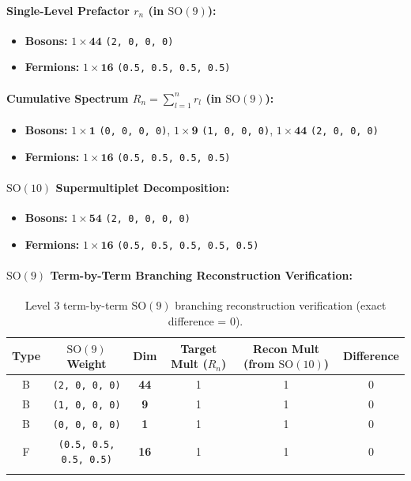 \documentclass[11pt,a4paper]{article}
\begin{document}
\paragraph{Single-Level Prefactor $r_n$ (in $\mathrm{SO}(9)$):}
\begin{itemize}
    \item \textbf{Bosons:} $1 \times \mathbf{44}$ \texttt{(2, 0, 0, 0)}
    \item \textbf{Fermions:} $1 \times \mathbf{16}$ \texttt{(0.5, 0.5, 0.5, 0.5)}
\end{itemize}
\paragraph{Cumulative Spectrum $R_n = \sum_{l=1}^n r_l$ (in $\mathrm{SO}(9)$):}
\begin{itemize}
    \item \textbf{Bosons:} $1 \times \mathbf{1}$ \texttt{(0, 0, 0, 0)}, $1 \times \mathbf{9}$ \texttt{(1, 0, 0, 0)}, $1 \times \mathbf{44}$ \texttt{(2, 0, 0, 0)}
    \item \textbf{Fermions:} $1 \times \mathbf{16}$ \texttt{(0.5, 0.5, 0.5, 0.5)}
\end{itemize}
\paragraph{$\mathrm{SO}(10)$ Supermultiplet Decomposition:}
\begin{itemize}
    \item \textbf{Bosons:} $1 \times \mathbf{54}$ \texttt{(2, 0, 0, 0, 0)}
    \item \textbf{Fermions:} $1 \times \mathbf{16}$ \texttt{(0.5, 0.5, 0.5, 0.5, 0.5)}
\end{itemize}
\paragraph{$\mathrm{SO}(9)$ Term-by-Term Branching Reconstruction Verification:}
\begin{longtable}{@{}cccccc@{}}
\toprule
Type & $\mathrm{SO}(9)$ Weight & Dim & Target Mult ($R_n$) & Recon Mult (from $\mathrm{SO}(10)$) & Difference \\
\midrule
\endhead
B & \texttt{(2, 0, 0, 0)} & \textbf{44} & 1 & 1 & 0 \\
B & \texttt{(1, 0, 0, 0)} & \textbf{9} & 1 & 1 & 0 \\
B & \texttt{(0, 0, 0, 0)} & \textbf{1} & 1 & 1 & 0 \\
F & \texttt{(0.5, 0.5, 0.5, 0.5)} & \textbf{16} & 1 & 1 & 0 \\
\bottomrule
\caption{Level 3 term-by-term $\mathrm{SO}(9)$ branching reconstruction verification (exact difference = 0).}
\end{longtable}
\end{document}
